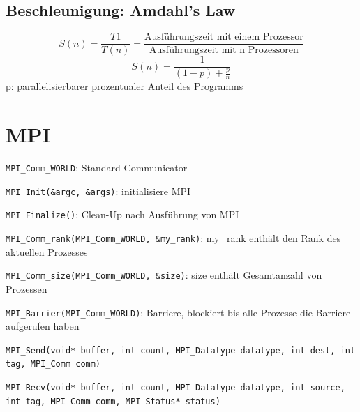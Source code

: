 \subsection{Beschleunigung: Amdahl's Law }
$$S(n) = \frac{T1}{T(n)}=\frac{\text{Ausführungszeit mit einem Prozessor}}{\text{Ausführungszeit mit n Prozessoren}}$$
$$S(n)= \frac{1}{(1-p)+ \frac{p}{n}}$$
p: parallelisierbarer prozentualer Anteil des Programms

\section{MPI}
\begin{compactitem}
	\item \texttt{MPI\_Comm\_WORLD}: Standard Communicator	
	\item \texttt{MPI\_Init(\&argc, \&args)}: initialisiere MPI
	\item \texttt{MPI\_Finalize()}: Clean-Up nach Ausführung von MPI
	\item \texttt{MPI\_Comm\_rank(MPI\_Comm\_WORLD, \&my\_rank)}: my\_rank enthält den Rank des aktuellen Prozesses
	\item \texttt{MPI\_Comm\_size(MPI\_Comm\_WORLD, \&size)}: size enthält Gesamtanzahl von Prozessen
	\item \texttt{MPI\_Barrier(MPI\_Comm\_WORLD)}: Barriere, blockiert bis alle Prozesse die Barriere aufgerufen haben
	\item \texttt{MPI\_Send(void* buffer, int count, MPI\_Datatype datatype, int dest, int tag, MPI\_Comm comm)}
	\item \texttt{MPI\_Recv(void* buffer, int count, MPI\_Datatype datatype, int source, int tag, MPI\_Comm comm, MPI\_Status* status)}
\end{compactitem}